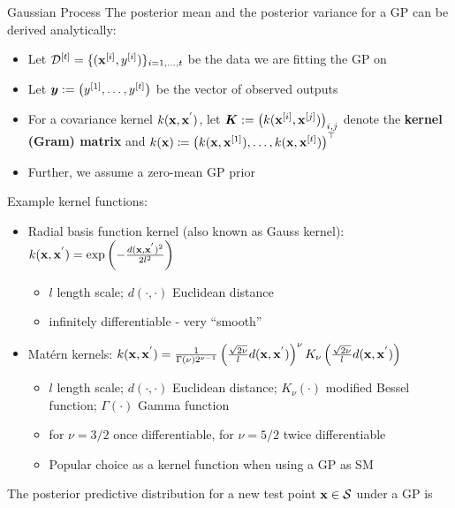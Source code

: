 \documentclass[11pt,compress,t,notes=noshow, xcolor=table]{beamer}
\begin{document}
\begin{vbframe}{Gaussian Process}
The posterior mean and the posterior variance for a GP can be derived analytically: 
\vspace{1em}
\begin{itemize}
  \item Let $\mathcal{D}^{[t]} = \{(\mathbf{x}^{[i]}, y^{[i]})\}_{i = 1, \ldots, t}$ be the data we are fitting the GP on
  \item Let $\bm{y}:= \left(y^{[1]}, \ldots, y^{[t]}\right)$ be the vector of observed outputs
  \item For a covariance kernel $k(\mathbf{x}, \mathbf{x}^{'})$, let $\bm{K} := \left(k(\mathbf{x}^{[i]}, \mathbf{x}^{[j]})\right)_{i,j}$ denote the \textbf{kernel (Gram) matrix} and $k(\mathbf{x}) \coloneqq \left(k(\mathbf{x}, \mathbf{x}^{[1]}), \ldots, k(\mathbf{x}, \mathbf{x}^{[t]})\right)^\top$
  \item Further, we assume a zero-mean GP prior
\end{itemize}

\framebreak 

Example kernel functions:
\vspace{1em}
\begin{itemize}
  \item Radial basis function kernel (also known as Gauss kernel): $k(\mathbf{x}, \mathbf{x}^{'})=\exp \left(-\frac{d(\mathbf{x}, \mathbf{x}^{'})^2}{2 l^2}\right)$
  \begin{itemize}
    \item $l$ length scale; $d(\cdot, \cdot)$ Euclidean distance
    \item infinitely differentiable - very \enquote{smooth}
  \end{itemize}
  \item Matérn kernels: $k(\mathbf{x}, \mathbf{x}^{'})=\frac{1}{\Gamma(\nu) 2^{\nu-1}}\left(\frac{\sqrt{2 \nu}}{l} d(\mathbf{x}, \mathbf{x}^{'})\right)^\nu K_\nu\left(\frac{\sqrt{2 \nu}}{l} d(\mathbf{x}, \mathbf{x}^{'})\right)$
  \begin{itemize}
    \item $l$ length scale; $d(\cdot, \cdot)$ Euclidean distance; $K_\nu(\cdot)$ modified Bessel function; $\Gamma(\cdot)$ Gamma function \item for $\nu = 3/2$ once differentiable, for $\nu = 5/2$ twice differentiable
    \item Popular choice as a kernel function when using a GP as SM
  \end{itemize}
\end{itemize}

\framebreak

The posterior predictive distribution for a new test point $\mathbf{x} \in \mathcal{S}$ under a GP is


\end{vbframe}
\end{document}
